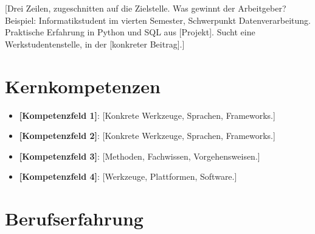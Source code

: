 \documentclass[11pt,a4paper,sans]{moderncv}
\newcommand{\headingCompetencies}{Kernkompetenzen}
\newcommand{\headingExperience}{Berufserfahrung}
\begin{document}
\makecvtitle


\vspace{6pt}
{\small [Drei Zeilen, zugeschnitten auf die Zielstelle. Was gewinnt der Arbeitgeber? Beispiel: \glqq Informatikstudent im vierten Semester, Schwerpunkt Datenverarbeitung. Praktische Erfahrung in Python und SQL aus [Projekt]. Sucht eine Werkstudentenstelle, in der [konkreter Beitrag].\grqq{}]}


\section{\headingCompetencies}
\vspace{1pt}
\begin{itemize}

\item \textbf{[Kompetenzfeld 1]}: [Konkrete Werkzeuge, Sprachen, Frameworks.]

\item \textbf{[Kompetenzfeld 2]}: [Konkrete Werkzeuge, Sprachen, Frameworks.]

\item \textbf{[Kompetenzfeld 3]}: [Methoden, Fachwissen, Vorgehensweisen.]

\item \textbf{[Kompetenzfeld 4]}: [Werkzeuge, Plattformen, Software.]

\end{itemize}


\section{\headingExperience}
\vspace{3pt}
\end{document}
